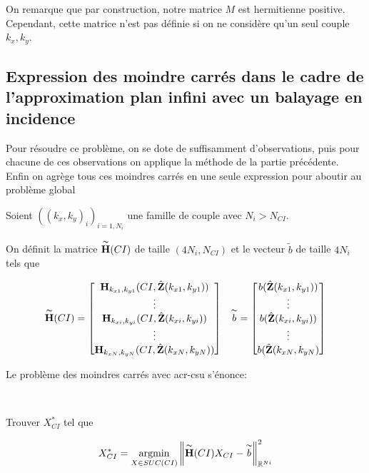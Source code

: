   On remarque que par construction, notre matrice \(M\) est hermitienne positive. Cependant, cette matrice n'est pas définie si on ne considère qu'un seul couple \(k_x, k_y\).

\subsection{Expression des moindre carrés dans le cadre de l'approximation plan infini avec un balayage en incidence}

  Pour résoudre ce problème, on se dote de suffisamment d'observations, puis pour chacune de ces observations on applique la méthode de la partie précédente. Enfin on agrège tous ces moindres carrés en une seule expression pour aboutir au problème global

  Soient \(((k_x,k_y)_i)_{i=1,N_{i}}\) une famille de couple avec \(N_{i} > N_{CI}\).

  \begin{defn}
    On définit la matrice \(\overset{\thicksim}{\mathbf{H}}(CI)\) de taille \((4N_{i},N_{CI})\) et le vecteur \(\tilde{b}\) de taille \(4N_{i}\) tels que

  \begin{align}
    \overset{\thicksim}{\mathbf{H}}(CI) = \begin{bmatrix}
      \mathbf{H}_{k_{x1},k_{y1}} (CI,\hat{\mathbf{Z}}(k_{x1},k_{y1}))
      \\
      \vdots
      \\
      \mathbf{H}_{k_{xi},k_{yi}} (CI,\hat{\mathbf{Z}}(k_{xi},k_{yi}))
      \\
      \vdots
      \\
      \mathbf{H}_{k_{xN},k_{yN}} (CI,\hat{\mathbf{Z}}(k_{xN},k_{yN}))
      \end{bmatrix}
    &&
    \overset{\thicksim}{b} = \begin{bmatrix}
     b(\hat{\mathbf{Z}}(k_{x1},k_{y1}))
     \\ 
     \vdots 
     \\ 
     b(\hat{\mathbf{Z}}(k_{xi},k_{yi}))
     \\
     \vdots
     \\ 
     b(\hat{\mathbf{Z}}(k_{xN},k_{yN})
     \end{bmatrix}
  \end{align}
  \end{defn}

  Le problème des moindres carrés avec \gls{acr-csu} s'énonce:

  \begin{prop}
  ~

  Trouver \(X_{CI}^*\) tel que

  \[
    X_{CI}^* = {\underset{X \in SUC(CI)}{\operatorname{argmin}}} \left\lVert \overset{\thicksim}{\mathbf{H}}(CI)X_{CI} - \overset{\thicksim}{b}\right\rVert^2_{\mathbb R^{Ni}}
  \]
  \end{prop}

